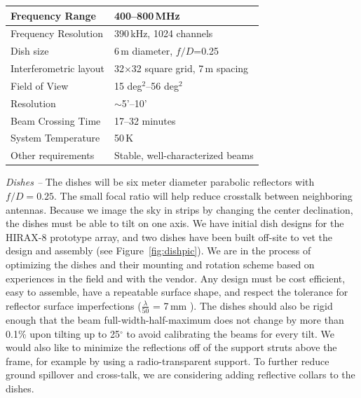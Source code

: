 \documentclass[]{spie}  %
\begin{document}
\begin{minipage}{0.5\textwidth}
  \centering
    \begin{tabular}{|l|l|} 
   \hline
   \rule[-1ex]{0pt}{3.5ex}  Frequency Range & 400--800\,MHz  \\ \hline
   \rule[-1ex]{0pt}{3.5ex}  Frequency Resolution & 390\,kHz, 1024 channels \\ \hline
   \rule[-1ex]{0pt}{3.5ex}  Dish size & 6\,m diameter, $f/D$=0.25 \\ \hline
   \rule[-1ex]{0pt}{3.5ex}  Interferometric layout & 32$\times$32 square grid, 7\,m spacing  \\ \hline
   \rule[-1ex]{0pt}{3.5ex}  Field of View & 15 deg$^{2}$--56 deg$^{2}$ \\ \hline
   \rule[-1ex]{0pt}{3.5ex}  Resolution & $\sim$5'--10'  \\ \hline 
   \rule[-1ex]{0pt}{3.5ex}  Beam Crossing Time & 17--32 minutes   \\ \hline  
   \rule[-1ex]{0pt}{3.5ex}  System Temperature & 50\,K \\ \hline
   \rule[-1ex]{0pt}{3.5ex}  Other requirements & Stable, well-characterized beams   \\ \hline 
   \end{tabular}
   \vspace{0.2in}
       \label{tab:salient}
          \vspace{0.1in}
      \label{fig:instrument}
\end{minipage}


\textit{Dishes --} The dishes will be six meter diameter parabolic reflectors with $f/D = 0.25$. The small focal ratio will help reduce crosstalk between neighboring antennas.  Because we image the sky in strips by changing the center declination, the dishes must be able to tilt on one axis. We have initial dish designs for the HIRAX-8 prototype array, and two dishes have been built off-site to vet the design and assembly (see Figure~\ref{fig:dishpic}). We are in the process of optimizing the dishes and their mounting and rotation scheme based on experiences in the field and with the vendor. Any design must be cost efficient, easy to assemble, have a repeatable surface shape, and respect the tolerance for reflector surface imperfections ($\frac{\lambda}{50}$ = 7\,mm \cite{Ruze1952}). The dishes should also be rigid enough that the beam full-width-half-maximum does not change by more than 0.1\% \cite{2015PhRvD..91h3514S} upon tilting up to 25$^{\circ}$ to avoid calibrating the beams for every tilt. We would also like to minimize the reflections off of the support struts above the frame, for example by using a radio-transparent support. To further reduce ground spillover and cross-talk, we are considering adding reflective collars to the dishes. \newline
\end{document}
